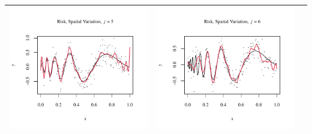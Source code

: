 \documentclass[11pt]{article}
\begin{document}
\begin{table}[h!]
\begin{center}
\begin{tabular}{| >{\centering\arraybackslash}m{2.1in} |  >{\centering\arraybackslash}m{2.1in} |  >{\centering\arraybackslash}m{2.1in}|}
      \includegraphics[width=1\linewidth,height=0.18\textheight]{Graphs/4/3/assignment5_a_4_3_5}&
      \includegraphics[width=1\linewidth,height=0.18\textheight]{Graphs/4/3/assignment5_a_4_3_6}\\\hline
    \end{tabular}
  \end{center}
\end{table}
\end{document}
